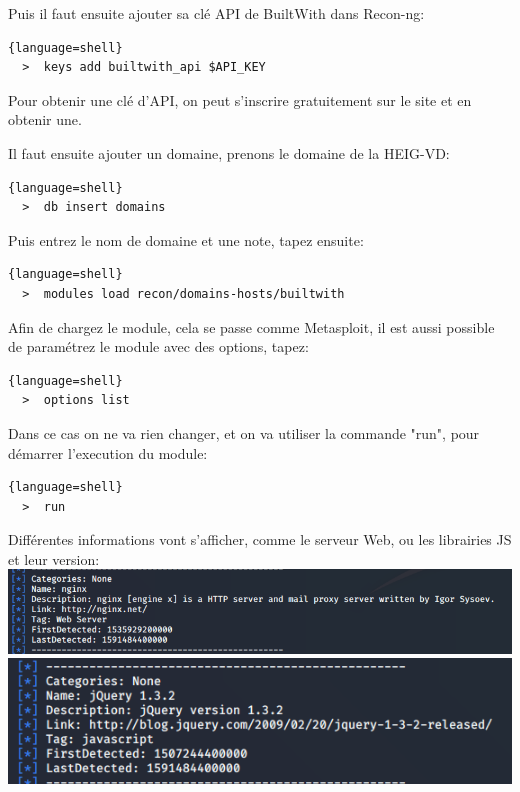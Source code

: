 Puis il faut ensuite ajouter sa clé API de BuiltWith dans Recon-ng:

\begin{lstlisting}{language=shell}
  >  keys add builtwith_api $API_KEY
\end{lstlisting}

Pour obtenir une clé d'API, on peut s'inscrire gratuitement sur le site et en obtenir une.

Il faut ensuite ajouter un domaine, prenons le domaine de la HEIG-VD:

\begin{lstlisting}{language=shell}
  >  db insert domains
\end{lstlisting}

Puis entrez le nom de domaine et une note, tapez ensuite:

\begin{lstlisting}{language=shell}
  >  modules load recon/domains-hosts/builtwith
\end{lstlisting}

Afin de chargez le module, cela se passe comme Metasploit, il est aussi possible de paramétrez le
module avec des options, tapez:

\begin{lstlisting}{language=shell}
  >  options list
\end{lstlisting}

Dans ce cas on ne va rien changer, et on va utiliser la commande "run", pour démarrer l'execution du module:

\begin{lstlisting}{language=shell}
  >  run
\end{lstlisting}

Différentes informations vont s'afficher, comme le serveur Web, ou les librairies JS et leur version: \\

\includegraphics[scale=0.48]{images/SEN_Projet_Image019.png} \\

\includegraphics[scale=0.48]{images/SEN_Projet_Image020.png}

